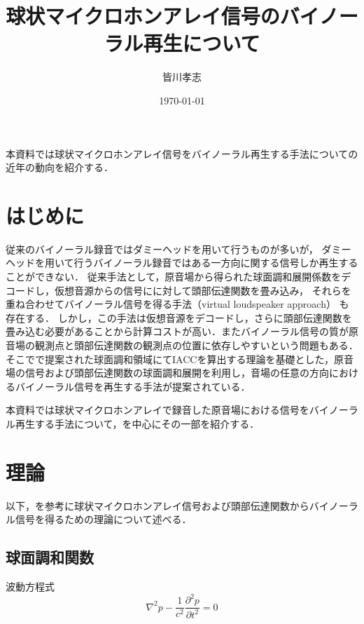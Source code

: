 \documentclass[a4paper]{jsarticle}
\begin{document}
\title{球状マイクロホンアレイ信号のバイノーラル再生について}
\author{皆川孝志}
\date{\today}
\maketitle

本資料では球状マイクロホンアレイ信号をバイノーラル再生する手法についての近年の動向を紹介する．

\section{はじめに}
従来のバイノーラル録音ではダミーヘッドを用いて行うものが多いが，
ダミーヘッドを用いて行うバイノーラル録音ではある一方向に関する信号しか再生することができない\cite{Andersson_undated-qg}．
従来手法として，原音場から得られた球面調和展開係数をデコードし，仮想音源からの信号にに対して頭部伝達関数を畳み込み，
それらを重ね合わせてバイノーラル信号を得る手法\cite{Jot1999-bt, Noisternig2003-ug}（virtual loudspeaker approach）
も存在する．
しかし，この手法は仮想音源をデコードし，さらに頭部伝達関数を畳み込む必要があることから計算コストが高い．またバイノーラル信号の質が原音場の観測点と頭部伝達関数の観測点の位置に依存しやすいという問題もある．
そこで\cite{Rafaely2010-ea}で提案された球面調和領域にてIACCを算出する理論を基礎とした，原音場の信号および頭部伝達関数の球面調和展開を利用し，音場の任意の方向におけるバイノーラル信号を再生する手法が提案されている\cite{Andersson_undated-qg, Ben-Hur2017-gm, Bernschutz2016-be,Otani2020-cg,Schorkhuber2018-ql, Sheaffer2014-bo, Zaunschirm2018-mn}．

本資料では球状マイクロホンアレイで録音した原音場における信号をバイノーラル再生する手法について，\cite{Andersson_undated-qg}を中心にその一部を紹介する．

\section{理論}
以下，\cite{Andersson_undated-qg}を参考に球状マイクロホンアレイ信号および頭部伝達関数からバイノーラル信号を得るための理論について述べる．

\subsection{球面調和関数}
波動方程式
\begin{equation}
    \label{wave-equation}
    \nabla^{2} p-\frac{1}{c^{2}} \frac{\partial^{2} p}{\partial t^{2}}=0
\end{equation}
\end{document}
